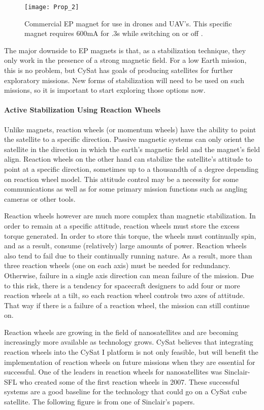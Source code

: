 \documentclass[nocover]            %
{CSLI}                       %
\begin{document}
\begin{figure}[H]
\centering
    \texttt{[image: Prop\_2]}
    \caption{Commercial EP magnet for use in drones and UAV's. This specific magnet requires 600mA for .3s while switching on or off \cite{NicaDrone}.}
\end{figure}

The major downside to EP magnets is that, as a stabilization technique, they only work in the presence of a strong magnetic field. For a low Earth mission, this is no problem, but CySat has goals of producing satellites for further exploratory missions. New forms of stabilization will need to be used on such missions, so it is important to start exploring those options now.
\paragraph{Active Stabilization Using Reaction Wheels\\}
Unlike magnets, reaction wheels (or momentum wheels) have the ability to point the satellite to a specific direction. Passive magnetic systems can only orient the satellite in the direction in which the earth's magnetic field and the magnet's field align. Reaction wheels on the other hand can stabilize the satellite's attitude to point at a specific direction, sometimes up to a thousandth of a degree depending on reaction wheel model. This attitude control may be a necessity for some communications as well as for some primary mission functions such as angling cameras or other tools.

Reaction wheels however are much more complex than magnetic stabilization. In order to remain at a specific attitude, reaction wheels must store the excess torque generated. In order to store this torque, the wheels must continually spin, and as a result, consume (relatively) large amounts of power. Reaction wheels also tend to fail due to their continually running nature. As a result, more than three reaction wheels (one on each axis) must be needed for redundancy. Otherwise, failure in a single axis direction can mean failure of the mission. Due to this risk, there is a tendency for spacecraft designers to add four or more reaction wheels at a tilt, so each reaction wheel controls two axes of attitude. That way if there is a failure of a reaction wheel, the mission can still continue on.

Reaction wheels are growing in the field of nanosatellites and are becoming increasingly more available as technology grows. CySat believes that integrating reaction wheels into the CySat I platform is not only feasible, but will benefit the implementation of reaction wheels on future missions when they are essential for successful. One of the leaders in reaction wheels for nanosatellites was Sinclair-SFL who created some of the first reaction wheels in 2007. These successful systems are a good baseline for the technology that could go on a CySat cube satellite. The following figure is from one of Sinclair's papers.
\end{document}

